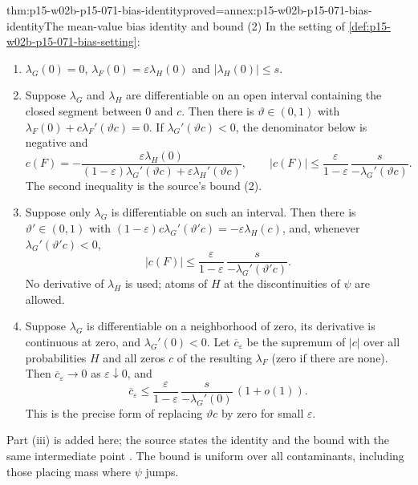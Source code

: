 \begin{hbtheorem}{thm:p15-w02b-p15-071-bias-identity}{proved=annex:p15-w02b-p15-071-bias-identity}{The mean-value bias identity and bound (2)}
In the setting of \cref{def:p15-w02b-p15-071-bias-setting}:
\begin{enumerate}
\item \(\lambda_G(0)=0\), \(\lambda_F(0)=\varepsilon\lambda_H(0)\)
 and \(|\lambda_H(0)|\leq s\).
\item Suppose \(\lambda_G\) and \(\lambda_H\) are differentiable on an
 open interval containing the closed segment between \(0\) and \(c\).
 Then there is \(\vartheta\in(0,1)\) with
 \(\lambda_F(0)+c\lambda_F'(\vartheta c)=0\).
 If \(\lambda_G'(\vartheta c)<0\), the denominator below is negative and
 \[
  c(F)=-\frac{\varepsilon\lambda_H(0)}
  {(1-\varepsilon)\lambda_G'(\vartheta c)+\varepsilon\lambda_H'(\vartheta c)},
 \qquad
  |c(F)|\leq\frac{\varepsilon}{1-\varepsilon}\,
              \frac{s}{-\lambda_G'(\vartheta c)} .
 \]
 The second inequality is the source's bound (2).
\item Suppose only \(\lambda_G\) is differentiable on such an interval.
 Then there is \(\vartheta'\in(0,1)\) with
 \((1-\varepsilon)c\lambda_G'(\vartheta'c)=-\varepsilon\lambda_H(c)\),
 and, whenever \(\lambda_G'(\vartheta'c)<0\),
 \[
  |c(F)|\leq\frac{\varepsilon}{1-\varepsilon}\,
              \frac{s}{-\lambda_G'(\vartheta'c)} .
 \]
 No derivative of \(\lambda_H\) is used; atoms of \(H\) at the
 discontinuities of \(\psi\) are allowed.
\item Suppose \(\lambda_G\) is differentiable on a neighborhood of zero,
 its derivative is continuous at zero, and \(\lambda_G'(0)<0\).
 Let \(\overline c_\varepsilon\) be the supremum of \(|c|\) over all
 probabilities \(H\) and all zeros \(c\) of the resulting \(\lambda_F\)
 (zero if there are none). Then \(\overline c_\varepsilon\to0\) as
 \(\varepsilon\downarrow0\), and
 \[
  \overline c_\varepsilon\leq
  \frac{\varepsilon}{1-\varepsilon}\,\frac{s}{-\lambda_G'(0)}\,(1+o(1)).
 \]
 This is the precise form of replacing \(\vartheta c\) by zero for
 small \(\varepsilon\).
\end{enumerate}
\end{hbtheorem}

Part (iii) is added here; the source states the identity and the bound
with the same intermediate point \cite[p.~83]{Huber1964RobustLocation}.
The bound is uniform over all contaminants, including those placing
mass where \(\psi\) jumps.

